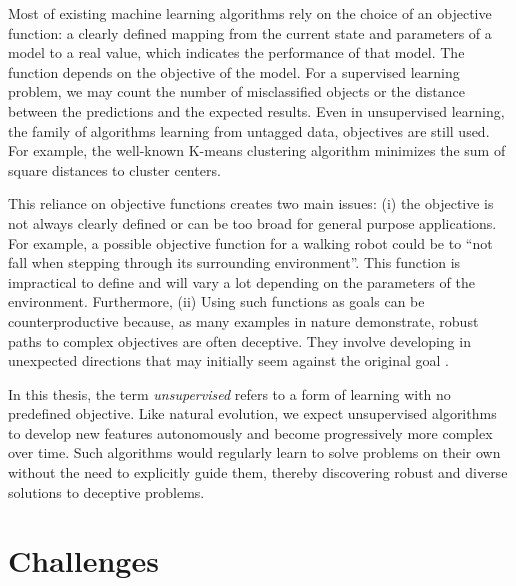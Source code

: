Most of existing machine learning algorithms rely on the choice of an objective
function: a clearly defined mapping from the current state and parameters of a
model to a real value, which indicates the performance of that model. The
function depends on the objective of the model. For a supervised learning
problem, we may count the number of misclassified objects or the distance between
the predictions and the expected results. Even in unsupervised learning, the family of
algorithms learning from untagged data, objectives are still used. For
example, the well-known K-means clustering algorithm minimizes the sum of square
distances to cluster centers.

This reliance on objective functions creates two main issues: (i) the objective
is not always clearly defined or can be too broad for general purpose
applications. For example, a possible objective function for a walking robot
could be to ``not fall when stepping through its surrounding environment''. This
function is impractical to define and will vary a lot depending on the
parameters of the environment. Furthermore, (ii) Using such functions as goals
can be counterproductive because, as many examples in nature demonstrate, robust
paths to complex objectives are often deceptive. They involve developing in
unexpected directions that may initially seem against the original goal
\parencite{stanleyWhyGreatnessCannot2015}.

In this thesis, the term \emph{unsupervised} refers to a form of learning with
no predefined objective. Like natural evolution, we expect unsupervised
algorithms to develop new features autonomously and become progressively more
complex over time. Such algorithms would regularly learn to solve problems on
their own without the need to explicitly guide them, thereby discovering robust
and diverse solutions to deceptive problems.


\section{Challenges}\label{sec:challenges}

